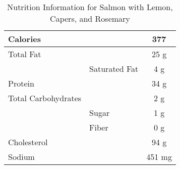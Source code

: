 \begin{table}%
    \centering
    \begin{tabular}{|ll|c|}
        \hline
        Calories & & 377\\
        \hline
        Total Fat & & 25 g \\
        & Saturated Fat & 4 g\\
        \hline
        Protein & & 34 g\\
        \hline
        Total Carbohydrates & & 2 g\\
        & Sugar & 1 g\\
        & Fiber & 0 g\\
        \hline
        Cholesterol & & 94 g\\
        \hline
        Sodium & & 451 mg\\
        \hline
    \end{tabular}
    \caption{Nutrition Information for Salmon with Lemon, Capers, and Rosemary}
\end{table}
